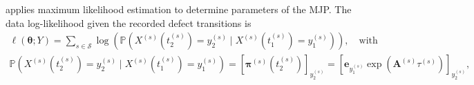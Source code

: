 \documentclass{article}
\providecommand{\DIFaddbegin}{} %
\providecommand{\DIFaddend}{} %
\providecommand{\DIFdelbegin}{} %
\providecommand{\DIFdelend}{} %
\begin{document}
\citet{bisgaard2024A} applies maximum likelihood estimation to determine parameters of the MJP.
The data log-likelihood given the recorded defect transitions is 
\DIFdelbegin %
\DIFdelend \DIFaddbegin \begin{equation}
\begin{aligned}
                  \ell\left( \bm{\theta}; Y \right) = 
                  \sum_{s \in \mathcal{S}} \log \left( \mathds{P}\left(X^{(s)}(t_2^{(s)}) = y_2^{(s)} \mid X^{(s)}(t_1^{(s)}) = y_1^{(s)} \right) \right), \quad \text{with} \\ 
                 \mathds{P}\left(X^{(s)}(t_2^{(s)}) = y_2^{(s)} \mid X^{(s)}(t_1^{(s)}) = y_1^{(s)} \right) = \left[ \bm{\pi}^{(s)}\left( t_2^{(s)} \right)  \right]_{ y_2^{(s)}} =  \left[ \bm{e}_{y_{1}^{(s)}}  \exp \left( \bm{A}^{(s)} \tau^{(s)} \right) \right]_{ y_2^{(s)}},
                  \label{eq:likelihood_mjp}
\end{aligned}     
\end{equation}\DIFaddend 
\end{document}
